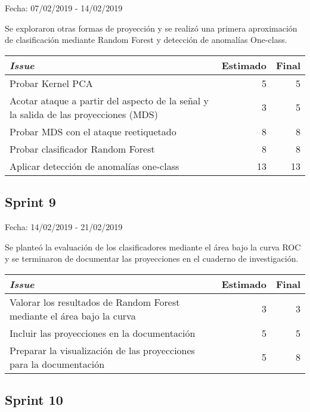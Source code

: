 Fecha: 07/02/2019 - 14/02/2019

Se exploraron otras formas de proyección y se realizó una primera aproximación de clasificación mediante Random Forest y detección de anomalías One-class. 

\begin{table}[h]
	\begin{tabularx}{\textwidth}{|Xrr|}
		\hline \textbf{\textit{Issue}} & \textbf{Estimado} & \textbf{Final}\\
		\hline Probar Kernel PCA & 5 & 5 \\
		\hline Acotar ataque a partir del aspecto de la señal y la salida de las proyecciones (MDS) & 3 & 5 \\
		\hline Probar MDS con el ataque reetiquetado & 8 & 8 \\
		\hline Probar clasificador Random Forest & 8 & 8 \\
		\hline Aplicar detección de anomalías one-class & 13 & 13 \\
		\hline
	\end{tabularx}
\end{table}


\subsection{Sprint 9}

Fecha: 14/02/2019 - 21/02/2019

Se planteó la evaluación de los clasificadores mediante el área bajo la curva ROC y se terminaron de documentar las proyecciones en el cuaderno de investigación. 

\begin{table}[h]
	\begin{tabularx}{\textwidth}{|Xrr|}
		\hline \textbf{\textit{Issue}} & \textbf{Estimado} & \textbf{Final}\\
		\hline Valorar los resultados de Random Forest mediante el área bajo la curva & 3 & 3 \\
		\hline Incluir las proyecciones en la documentación & 5 & 5 \\
		\hline Preparar la visualización de las proyecciones para la documentación & 5 & 8 \\
		\hline
	\end{tabularx}
\end{table}

\subsection{Sprint 10}

